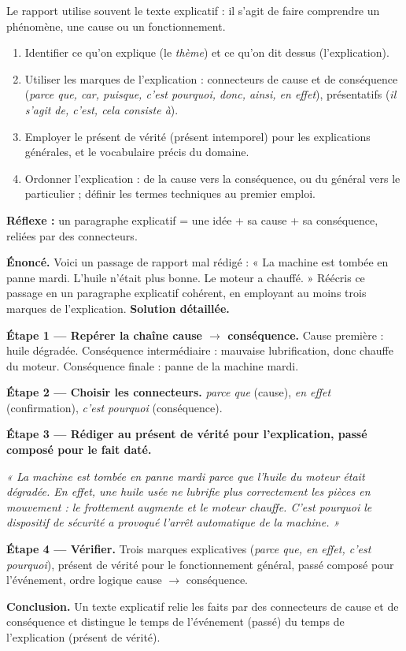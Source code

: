 \documentclass[11pt]{article}
\newcommand{\cle}[1]{{\popxbold\color{popdark}#1}}
\begin{document}
\begin{methode}
Le rapport utilise souvent le \cle{texte explicatif} : il s'agit de faire comprendre un phénomène, une cause ou un fonctionnement.
\begin{enumerate}
\item \cle{Identifier} ce qu'on explique (le \emph{thème}) et ce qu'on dit dessus (l'explication).
\item \cle{Utiliser les marques de l'explication} : connecteurs de cause et de conséquence (\emph{parce que, car, puisque, c'est pourquoi, donc, ainsi, en effet}), présentatifs (\emph{il s'agit de, c'est, cela consiste à}).
\item \cle{Employer le présent de vérité} (présent intemporel) pour les explications générales, et le vocabulaire précis du domaine.
\item \cle{Ordonner} l'explication : de la cause vers la conséquence, ou du général vers le particulier ; définir les termes techniques au premier emploi.
\end{enumerate}
\textbf{Réflexe :} un paragraphe explicatif = une idée + sa cause + sa conséquence, reliées par des connecteurs.
\end{methode}

\begin{exoresolu}
\textbf{Énoncé.} Voici un passage de rapport mal rédigé : « La machine est tombée en panne mardi. L'huile n'était plus bonne. Le moteur a chauffé. » Réécris ce passage en un paragraphe explicatif cohérent, en employant au moins trois marques de l'explication.
\tcblower
\textbf{Solution détaillée.}

\textbf{Étape 1 — Repérer la chaîne cause $\rightarrow$ conséquence.}
Cause première : huile dégradée. Conséquence intermédiaire : mauvaise lubrification, donc chauffe du moteur. Conséquence finale : panne de la machine mardi.

\textbf{Étape 2 — Choisir les connecteurs.} \emph{parce que} (cause), \emph{en effet} (confirmation), \emph{c'est pourquoi} (conséquence).

\textbf{Étape 3 — Rédiger au présent de vérité pour l'explication, passé composé pour le fait daté.}

\emph{« La machine est tombée en panne mardi parce que l'huile du moteur était dégradée. En effet, une huile usée ne lubrifie plus correctement les pièces en mouvement : le frottement augmente et le moteur chauffe. C'est pourquoi le dispositif de sécurité a provoqué l'arrêt automatique de la machine. »}

\textbf{Étape 4 — Vérifier.} Trois marques explicatives (\emph{parce que, en effet, c'est pourquoi}), présent de vérité pour le fonctionnement général, passé composé pour l'événement, ordre logique cause $\rightarrow$ conséquence.

\textbf{Conclusion.} Un texte explicatif relie les faits par des connecteurs de cause et de conséquence et distingue le temps de l'événement (passé) du temps de l'explication (présent de vérité).
\end{exoresolu}
\end{document}
